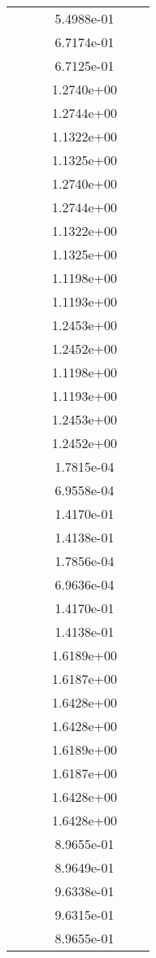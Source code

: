 \begin{xltabular}{\textwidth}{r|rS[table-format=1.3e+2]S[table-format=1.4e+2]S[table-format=1.4e+2]S[table-format=-1.5]}
&  &  & 5.4988e-01 & & \\
&  &  & 6.7174e-01 & & \\
&  &  & 6.7125e-01 & & \\
&  &  & 1.2740e+00 & & \\
&  &  & 1.2744e+00 & & \\
&  &  & 1.1322e+00 & & \\
&  &  & 1.1325e+00 & & \\
&  &  & 1.2740e+00 & & \\
&  &  & 1.2744e+00 & & \\
&  &  & 1.1322e+00 & & \\
&  &  & 1.1325e+00 & & \\
&  &  & 1.1198e+00 & & \\
&  &  & 1.1193e+00 & & \\
&  &  & 1.2453e+00 & & \\
&  &  & 1.2452e+00 & & \\
&  &  & 1.1198e+00 & & \\
&  &  & 1.1193e+00 & & \\
&  &  & 1.2453e+00 & & \\
&  &  & 1.2452e+00 & & \\
&  &  & 1.7815e-04 & & \\
&  &  & 6.9558e-04 & & \\
&  &  & 1.4170e-01 & & \\
&  &  & 1.4138e-01 & & \\
&  &  & 1.7856e-04 & & \\
&  &  & 6.9636e-04 & & \\
&  &  & 1.4170e-01 & & \\
&  &  & 1.4138e-01 & & \\
&  &  & 1.6189e+00 & & \\
&  &  & 1.6187e+00 & & \\
&  &  & 1.6428e+00 & & \\
&  &  & 1.6428e+00 & & \\
&  &  & 1.6189e+00 & & \\
&  &  & 1.6187e+00 & & \\
&  &  & 1.6428e+00 & & \\
&  &  & 1.6428e+00 & & \\
&  &  & 8.9655e-01 & & \\
&  &  & 8.9649e-01 & & \\
&  &  & 9.6338e-01 & & \\
&  &  & 9.6315e-01 & & \\
&  &  & 8.9655e-01 & & \\

\end{xltabular}
